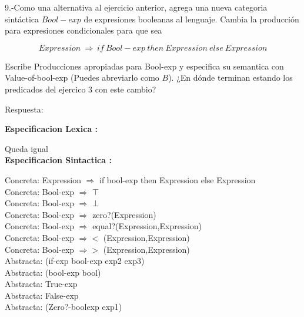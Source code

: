 \documentclass{article}
\begin{document}
9.-Como una alternativa al ejercicio anterior, agrega una nueva categoria sintáctica $Bool-exp$ de expresiones booleanas al lenguaje. Cambia la producción para expresiones condicionales para que sea \newline

$$
Expression \: \Rightarrow \: if \:  Bool-exp  \: then \: Expression \: else  \:Expression
$$

Escribe Producciones apropiadas para Bool-exp y especifica su semantica con Value-of-bool-exp (Puedes abreviarlo como $B$). ¿En dónde terminan estando los predicados del ejercico 3 con este cambio? \newline

Respuesta: \newline

\textbf{Especificacion Lexica :} \newline

Queda igual\\

\textbf{Especificacion Sintactica :} \newline

Concreta: Expression $\Rightarrow $ if bool-exp then Expression else Expression\\

Concreta: Bool-exp $\Rightarrow$ $\top$  \\

Concreta: Bool-exp $\Rightarrow$ $\bot$\\

Concreta: Bool-exp $\Rightarrow$ zero?(Expression)\\ 

Concreta: Bool-exp $\Rightarrow$ equal?(Expression,Expression)\\ 

Concreta: Bool-exp $\Rightarrow <$ (Expression,Expression)\\ 

Concreta: Bool-exp $\Rightarrow >$ (Expression,Expression)\\ 

Abstracta: (if-exp bool-exp exp2 exp3)\\

Abstracta: (bool-exp bool)\\

Abstracta: True-exp \\

Abstracta: False-exp\\

Abstracta: (Zero?-boolexp exp1)\\
\end{document}
